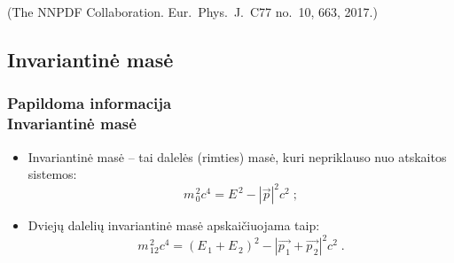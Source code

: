 \documentclass[xcolor=dvipsnames]{beamer}
\begin{document}
\begin{frame}
\begin{minipage}{0.49\textwidth}
	\end{minipage}
	\tiny (The NNPDF Collaboration. Eur.\ Phys.\ J.\ C77 no.\ 10, 663, 2017.)
\end{frame}


\begin{frame}
	\subsection{Invariantinė masė}
	\frametitle{Papildoma informacija\\ \small Invariantinė masė}
	\begin{itemize}
		\item Invariantinė masė -- tai dalelės (rimties) masė, kuri nepriklauso nuo atskaitos sistemos:
		\begin{equation*}
			\mathit{m}_{\, 0}^{\, 2} \mathit{c}^{4} = \mathit{E}^{\, 2}-|\vec{\mathit{p}}|^{2} \mathit{c}^{2} \; ;
		\end{equation*}
		\item Dviejų dalelių invariantinė masė apskaičiuojama taip:
		\begin{equation*}
			\mathit{m}_{\, 12}^{\, 2} \mathit{c}^{4} = ( \mathit{E}_{\, 1}+\mathit{E}_{\, 2} )^{2} -
										   			   | \vec{\mathit{p}_{\, 1}} + \vec{\mathit{p}_{\, 2}} |^{2} \mathit{c}^{2} \; .
		\end{equation*}
	\end{itemize}
\end{frame}
\end{document}
